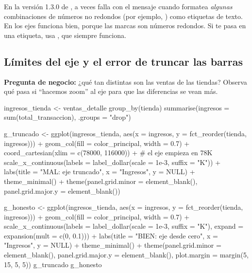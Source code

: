 \begin{advertencia}
En la versión 1.3.0 de ,  a
veces falla con el mensaje  cuando formatea \emph{algunas} combinaciones de números no
redondos (por ejemplo, ) como etiquetas de
texto. En los ejes funciona bien, porque las marcas son números redondos.
Si te pasa en una etiqueta, usa , que siempre funciona.
\end{advertencia}

\subsection{Límites del eje y el error de truncar las barras}

\textbf{Pregunta de negocio:} ¿qué tan distintas son las ventas de las
tiendas? Observa qué pasa si ``hacemos zoom'' al eje para que las
diferencias se vean más.

\begin{rcode}
ingresos_tienda <- ventas_detalle %
  group_by(tienda) %
  summarise(ingresos = sum(total_transaccion), .groups = "drop")

g_truncado <- ggplot(ingresos_tienda,
                     aes(x = ingresos,
                         y = fct_reorder(tienda, ingresos))) +
  geom_col(fill = color_principal, width = 0.7) +
  coord_cartesian(xlim = c(78000, 116000)) +   # el eje empieza en 78K
  scale_x_continuous(labels = label_dollar(scale = 1e-3,
                                           suffix = "K")) +
  labs(title = "MAL: eje truncado", x = "Ingresos", y = NULL) +
  theme_minimal() +
  theme(panel.grid.minor = element_blank(),
        panel.grid.major.y = element_blank())

g_honesto <- ggplot(ingresos_tienda,
                    aes(x = ingresos,
                        y = fct_reorder(tienda, ingresos))) +
  geom_col(fill = color_principal, width = 0.7) +
  scale_x_continuous(labels = label_dollar(scale = 1e-3,
                                           suffix = "K"),
                     expand = expansion(mult = c(0, 0.1))) +
  labs(title = "BIEN: eje desde cero", x = "Ingresos", y = NULL) +
  theme_minimal() +
  theme(panel.grid.minor = element_blank(),
        panel.grid.major.y = element_blank(),
        plot.margin = margin(5, 15, 5, 5))
g_truncado
g_honesto
\end{rcode}

